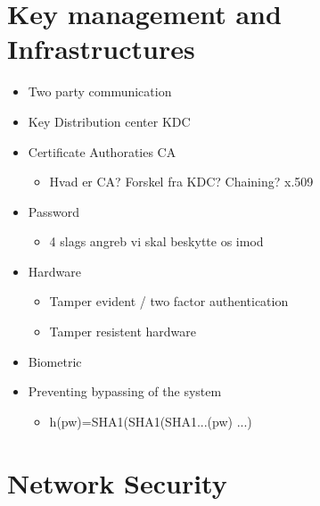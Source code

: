 \documentclass[paper=a4, fontsize=11pt]{scrartcl} %
\numberwithin{equation}{section} %
\numberwithin{figure}{section} %
\numberwithin{table}{section} %
\begin{document}
	\section{Key management and Infrastructures}
	
	\begin{itemize}
		\item Two party communication
		\item Key Distribution center KDC
		\item Certificate Authoraties CA
		\begin{itemize}
			\item Hvad er CA? Forskel fra KDC? Chaining? x.509
		\end{itemize}
		\item Password
		\begin{itemize}
			\item 4 slags angreb vi skal beskytte os imod
		\end{itemize}
		\item Hardware
		\begin{itemize}
			\item Tamper evident / two factor authentication
			\item Tamper resistent hardware
		\end{itemize}
		\item Biometric
		\item Preventing bypassing of the system
		\begin{itemize}
			\item h(pw)=SHA1(SHA1(SHA1...(pw) ...) 
		\end{itemize}
	\end{itemize}
	
	\section{Network Security}
	
\end{document}
